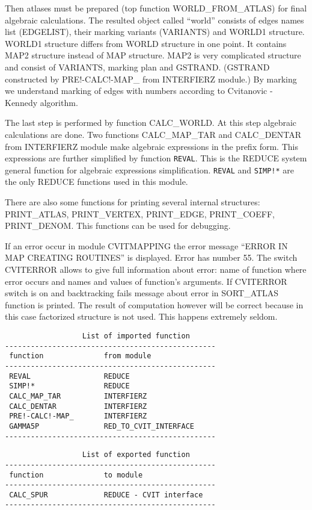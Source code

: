 Then atlases must be prepared (top function WORLD\_FROM\_ATLAS) for
final algebraic calculations.  The resulted object called ``world''
consists of edges names list (EDGELIST), their marking variants
(VARIANTS) and WORLD1 structure. WORLD1 structure differs from WORLD
structure in one point.  It contains MAP2 structure instead of MAP
structure. MAP2 is very complicated structure and consist of VARIANTS,
marking plan and GSTRAND.  (GSTRAND constructed by PRE!-CALC!-MAP\_
from INTERFIERZ module.)  By marking we understand marking of edges
with numbers according to Cvitanovic - Kennedy algorithm.

The last step is performed by function CALC\_WORLD. At this step
algebraic calculations are done.  Two functions CALC\_MAP\_TAR and
CALC\_DENTAR from INTERFIERZ module make algebraic expressions in the
prefix form. This expressions are further simplified by function
{\tt REVAL}.  This is the REDUCE system general function for algebraic
expressions simplification. {\tt REVAL} and {\tt SIMP!*} are the only REDUCE
functions used in this module.

There are also some functions for printing several internal
structures: PRINT\_ATLAS, PRINT\_VERTEX, PRINT\_EDGE, PRINT\_COEFF,
PRINT\_DENOM.  This functions can be used for debugging.

If an error occur in module CVITMAPPING the error message ``ERROR IN
MAP CREATING ROUTINES'' is displayed.  Error has number 55.  The switch
CVITERROR allows to give full information about error: name of
function where error occurs and names and values of function's
arguments. If CVITERROR switch is on and backtracking fails message
about error in SORT\_ATLAS function is printed.  The result of
computation however will be correct because in this case factorized
structure is not used. This happens extremely seldom.


\begin{verbatim}
                  List of imported function
-------------------------------------------------
 function              from module
-------------------------------------------------
 REVAL                 REDUCE
 SIMP!*                REDUCE
 CALC_MAP_TAR          INTERFIERZ
 CALC_DENTAR           INTERFIERZ
 PRE!-CALC!-MAP_       INTERFIERZ
 GAMMA5P               RED_TO_CVIT_INTERFACE
-------------------------------------------------
\end{verbatim}

\begin{verbatim}
                  List of exported function
-------------------------------------------------
 function              to module
-------------------------------------------------
 CALC_SPUR             REDUCE - CVIT interface
-------------------------------------------------
\end{verbatim}

